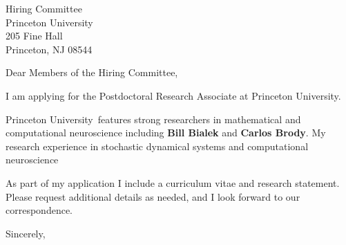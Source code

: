 \documentclass[11pt,a4paper]{letter}
\begin{document}
\def\School{Princeton University}
\begin{letter}
{Hiring Committee\\
Princeton University\\
205 Fine Hall\\
Princeton, NJ 08544
}


\opening{Dear Members of the Hiring Committee,}

I am applying for the Postdoctoral Research Associate at \School. 



\School~features strong researchers in mathematical and computational neuroscience including \textbf{Bill Bialek} and \textbf{Carlos Brody}. My research experience in stochastic dynamical systems and computational neuroscience 

As part of my application I include a curriculum vitae and research statement. Please request additional details as needed, and I look forward to our correspondence.

\closing{Sincerely,}
\end{letter}
\end{document}
